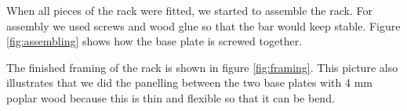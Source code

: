 \documentclass{acm_proc_article-sp}
\begin{document}
When all pieces of the rack were fitted, we started to assemble the rack. For assembly we used screws and wood glue so that the bar would keep stable. Figure \ref{fig:assembling} shows how the base plate is screwed together.

\begin{minipage}{\linewidth}%
\label{fig:framing}%
\end{minipage}


The finished framing of the rack is shown in figure \ref{fig:framing}. This picture also illustrates that we did the panelling between the two base plates with 4 mm poplar wood because this is thin and flexible so that it can be bend.

\begin{minipage}{\linewidth}%
\label{fig:filling}%
\end{minipage}
\end{document}
